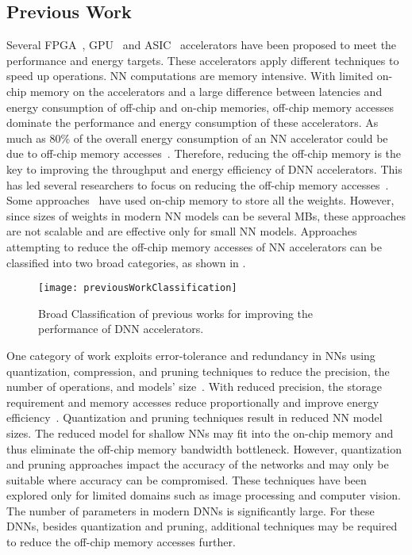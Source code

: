 \subsection{Previous Work}
Several FPGA~\cite{zhang2015optimizing,wei2019overcoming,gokhale2014240,8742284,gupta2015deep,alwani2016fused}, GPU~\cite{chetlur2014cudnn} and ASIC~\cite{Chen2016EyerissAS,chen2014diannao,chen2014dadiannao,du2015shidiannao} accelerators have been proposed to meet the performance and energy targets. These accelerators apply different techniques to speed up operations. NN computations are memory intensive. With limited on-chip memory on the accelerators and a large difference between latencies and energy consumption of off-chip and on-chip memories, off-chip memory accesses dominate the performance and energy consumption of these accelerators. As much as 80\% of the overall energy consumption
of an NN accelerator could be due to off-chip memory accesses~\cite{chen2014diannao}. Therefore, reducing the off-chip memory is the key to improving the throughput and energy efficiency of DNN accelerators. This has led several researchers to focus on reducing the off-chip
memory accesses~\cite{chen2014diannao,chen2016eyeriss,zhang2015optimizing}. Some approaches~\cite{lee2016fpga, rybalkin2018finn, ferreira2016fpga} have used on-chip memory to
store all the weights. However, since sizes of weights in modern NN models can be several MBs, these approaches are not scalable and are effective only for small NN models. Approaches attempting to reduce the off-chip memory accesses of NN accelerators can be classified into two broad categories, as shown in . 

\begin{figure}[!htb]
	\centering
	\captionsetup{font=sf}
	\texttt{[image: previousWorkClassification]}
	\caption{Broad Classification of previous works for improving the performance of DNN accelerators.}
	\label{fig:previousWorkClassification}
\end{figure}

One category of work exploits error-tolerance and redundancy in NNs using quantization, compression, and pruning techniques to reduce the precision, the number of operations, and models' size~\cite{ferreira2016fpga,wang2018c,chang2015recurrent,han2017ese,lee2016fpga}. With reduced precision, the storage requirement and memory accesses reduce proportionally and improve energy efficiency~\cite{sze2017efficient}. Quantization and pruning techniques result in reduced NN model sizes. The reduced model for shallow NNs may fit into the on-chip memory and thus eliminate the off-chip memory bandwidth bottleneck. However, quantization and pruning approaches impact the accuracy of the networks and may only be suitable where accuracy can be compromised. These techniques have been explored only for limited domains such as image
processing and computer vision. The number of parameters in modern DNNs is significantly large. For these DNNs, besides quantization and pruning, additional techniques may be required to reduce the off-chip memory accesses further.

